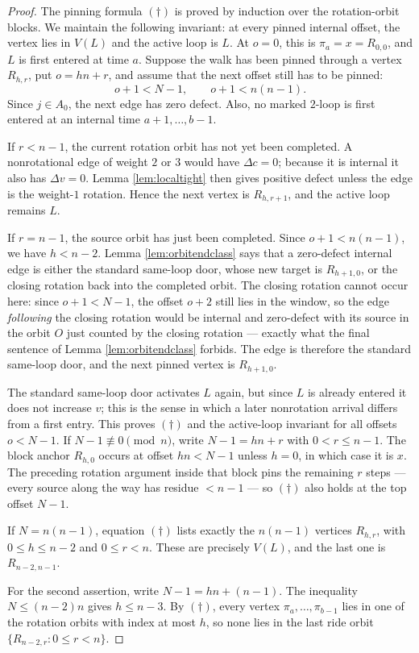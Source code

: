 \documentclass[11pt]{article}
\begin{document}
\begin{proof}
The pinning formula \((\dagger)\) is proved by induction over the rotation-orbit blocks.  We
maintain the following invariant:
at every pinned internal offset, the vertex lies in \(V(L)\) and the active loop is \(L\).  At
\(o=0\), this is \(\pi_a=x=R_{0,0}\), and \(L\) is first entered at time \(a\).  Suppose the walk
has been pinned through a vertex \(R_{h,r}\), put \(o=hn+r\), and assume that the next offset still
has to be pinned:
\[
  o+1<N-1,\qquad o+1<n(n-1).
\]
Since \(j\in A_0\), the next edge has zero defect.  Also, no marked \(2\)-loop is first entered at
an internal time \(a+1,\ldots,b-1\).

If \(r<n-1\), the current rotation orbit has not yet been completed.  A nonrotational edge of
weight \(2\) or \(3\) would have \(\Delta c=0\); because it is internal it also has
\(\Delta v=0\).  Lemma \ref{lem:localtight} then gives positive defect unless the edge is the
weight-\(1\) rotation.  Hence the next vertex is \(R_{h,r+1}\), and the active loop remains \(L\).

If \(r=n-1\), the source orbit has just been completed.  Since \(o+1<n(n-1)\), we have
\(h<n-2\).  Lemma \ref{lem:orbitendclass} says that a zero-defect internal edge is either the
standard same-loop door, whose new target is \(R_{h+1,0}\), or the closing rotation back into the
completed orbit.  The closing rotation cannot occur here: since \(o+1<N-1\), the offset
\(o+2\) still lies in the window, so the edge \emph{following} the closing rotation would be
internal and zero-defect with its source in the orbit \(O\) just counted by the closing
rotation --- exactly what the final sentence of Lemma \ref{lem:orbitendclass} forbids.  The
edge is therefore the standard same-loop door, and the next pinned vertex is \(R_{h+1,0}\).

The standard same-loop door activates \(L\) again, but since \(L\) is already entered it does not
increase \(v\); this is the sense in which a later nonrotation arrival differs from a first entry.
This proves \((\dagger)\) and the active-loop invariant for all offsets \(o<N-1\).  If
\(N-1\not\equiv 0\pmod n\), write
\(N-1=hn+r\) with \(0<r\le n-1\).  The block anchor \(R_{h,0}\) occurs at offset \(hn<N-1\)
unless \(h=0\), in which case it is \(x\).  The preceding rotation argument inside that block
pins the remaining \(r\) steps --- every source along the way has residue \(<n-1\) --- so
\((\dagger)\) also holds at the top offset \(N-1\).

If \(N=n(n-1)\), equation \((\dagger)\) lists exactly the \(n(n-1)\) vertices \(R_{h,r}\), with
\(0\le h\le n-2\) and \(0\le r<n\).  These are precisely \(V(L)\), and the last one is
\(R_{n-2,n-1}\).

For the second assertion, write \(N-1=hn+(n-1)\).  The inequality \(N\le(n-2)n\) gives
\(h\le n-3\).  By \((\dagger)\), every vertex \(\pi_a,\ldots,\pi_{b-1}\) lies in one of the rotation orbits
with index at most \(h\), so none lies in the last ride orbit
\(\{R_{n-2,r}:0\le r<n\}\).
\end{proof}
\end{document}
